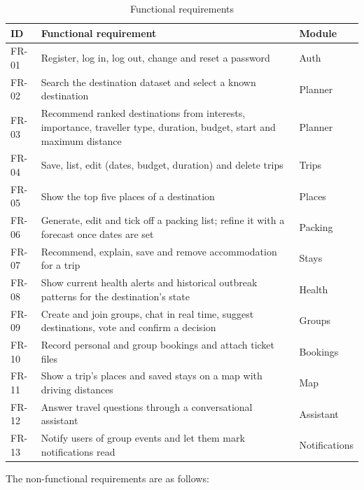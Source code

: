 \begin{table}[htbp]
\centering
\begin{tabular}{|l|L{0.56\textwidth}|l|}
  \hline
  \textbf{ID} & \textbf{Functional requirement} & \textbf{Module} \\
  \hline
  FR-01 & Register, log in, log out, change and reset a password & Auth \\
  \hline
  FR-02 & Search the destination dataset and select a known destination
    & Planner \\
  \hline
  FR-03 & Recommend ranked destinations from interests, importance,
    traveller type, duration, budget, start and maximum distance & Planner \\
  \hline
  FR-04 & Save, list, edit (dates, budget, duration) and delete trips
    & Trips \\
  \hline
  FR-05 & Show the top five places of a destination & Places \\
  \hline
  FR-06 & Generate, edit and tick off a packing list; refine it with a
    forecast once dates are set & Packing \\
  \hline
  FR-07 & Recommend, explain, save and remove accommodation for a trip
    & Stays \\
  \hline
  FR-08 & Show current health alerts and historical outbreak patterns for
    the destination's state & Health \\
  \hline
  FR-09 & Create and join groups, chat in real time, suggest destinations,
    vote and confirm a decision & Groups \\
  \hline
  FR-10 & Record personal and group bookings and attach ticket files
    & Bookings \\
  \hline
  FR-11 & Show a trip's places and saved stays on a map with driving
    distances & Map \\
  \hline
  FR-12 & Answer travel questions through a conversational assistant
    & Assistant \\
  \hline
  FR-13 & Notify users of group events and let them mark notifications read
    & Notifications \\
  \hline
\end{tabular}
\caption{Functional requirements}
\label{tab:functional-requirements}
\end{table}

The non-functional requirements are as follows:

